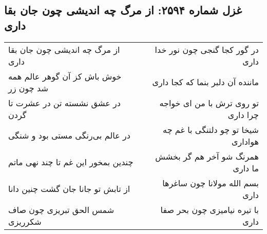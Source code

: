 \begin{center}
\section*{غزل شماره ۲۵۹۴: از مرگ چه اندیشی چون جان بقا داری}
\label{sec:2594}
\begin{longtable}{l p{0.5cm} r}
از مرگ چه اندیشی چون جان بقا داری
&&
در گور کجا گنجی چون نور خدا داری
\\
خوش باش کز آن گوهر عالم همه شد چون زر
&&
ماننده آن دلبر بنما که کجا داری
\\
در عشق نشسته تن در عشرت تا گردن
&&
تو روی ترش با من ای خواجه چرا داری
\\
در عالم بی‌رنگی مستی بود و شنگی
&&
شیخا تو چو دلتنگی با غم چه هواداری
\\
چندین بمخور این غم تا چند نهی ماتم
&&
همرنگ شو آخر هم گر بخشش ما داری
\\
از تابش تو جانا جان گشت چنین دانا
&&
بسم الله مولانا چون ساغرها داری
\\
شمس الحق تبریزی چون صاف شکرریزی
&&
با تیره نیامیزی چون بحر صفا داری
\\
\end{longtable}
\end{center}
